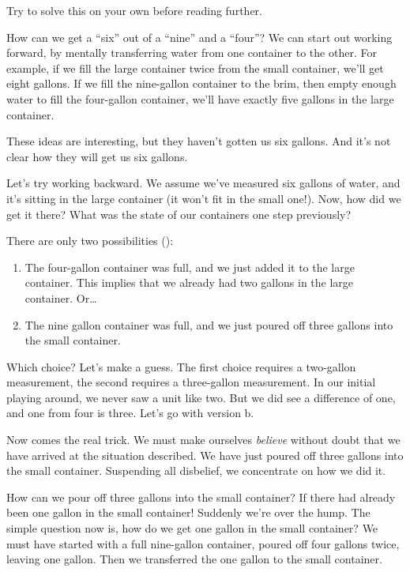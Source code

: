 


Try to solve this on your own before reading further.

How can we get a ``six'' out of a ``nine'' and a ``four''? We can
start out working forward, by mentally
transferring water from one container to the other. For example, if we
fill the large container twice from the small container, we'll get
eight gallons. If we fill the nine-gallon container to the brim, then
empty enough water to fill the four-gallon container, we'll have
exactly five gallons in the large container.

These ideas are interesting, but they haven't gotten us six gallons.
And it's not clear how they will get us six gallons.

Let's try working backward.
We assume we've measured six gallons
of water, and it's sitting in the large container (it won't fit in the
small one!). Now, how did we get it there? What was the state of our
containers one step previously?

There are only two possibilities ():
\begin{enumerate}
\item The four-gallon container was full, and we just added it to the large
   container. This implies that we already had two gallons in the large
   container.
Or\dots{}
\item The nine gallon container was full, and we just poured off three gallons
   into the small container.
\end{enumerate}
Which choice? Let's make a guess. The first choice requires a two-gallon
measurement, the second requires a three-gallon measurement. In our initial
playing around, we never saw a unit like two. But we did see a difference
of one, and one from four is three. Let's go with version b.

Now comes the real trick. We must make ourselves \emph{believe} without
doubt that we have arrived at the situation described. We have just
poured off three gallons into the small container. Suspending all disbelief,
we concentrate on how we did it.

How can we pour off three gallons into the small container? If there
had already been one gallon in the small container! Suddenly we're over
the hump. The simple question now is, how do we get one gallon in the
small container? We must have started with a full nine-gallon container,
poured off four gallons twice, leaving one gallon. Then we transferred the
one gallon to the small container.

